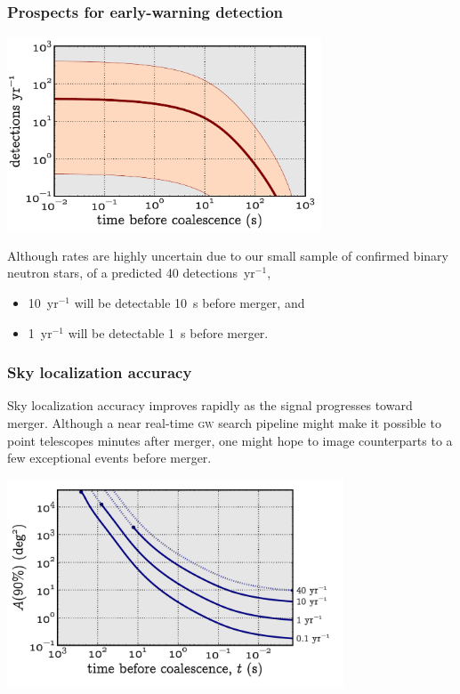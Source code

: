 \documentclass{beamer}
\begin{document}
\begin{frame}
	\frametitle{Prospects for early-warning detection}
	\begin{center}
		\includegraphics[width=0.7\textwidth]{figures/snr_in_time}
	\end{center}

	Although rates are highly uncertain due to our small sample of confirmed binary neutron stars, of a predicted 40 detections~yr$^{-1}$,
	\begin{itemize}
		\item 10~yr$^{-1}$ will be detectable 10~s before merger, and
		\item 1~yr$^{-1}$ will be detectable 1~s before merger.
	\end{itemize}
\end{frame}

\begin{frame}
	\frametitle{Sky localization accuracy}
	Sky localization accuracy improves rapidly as the signal progresses toward merger.  Although a near real-time \textsc{gw} search pipeline might make it possible to point telescopes minutes after merger, one might hope to image counterparts to a few exceptional events before merger.

	\begin{center}
		\includegraphics[width=0.75\textwidth]{figures/loc_in_time}
	\end{center}
\end{frame}
\end{document}

